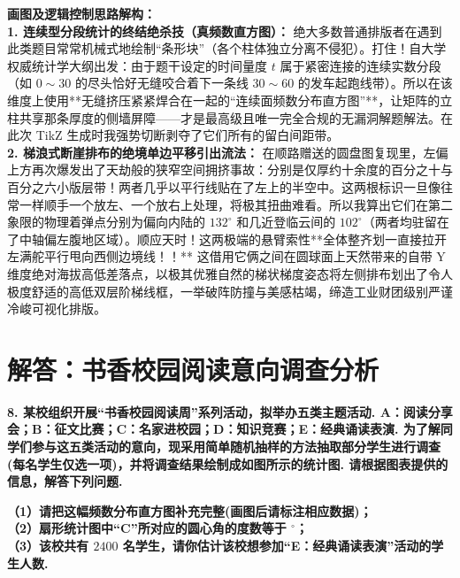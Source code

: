 {\small\color{blue!70!black}
\textbf{画图及逻辑控制思路解构：}\\
\textbf{1. 连续型分段统计的终结绝杀技（真频数直方图）：} 绝大多数普通排版者在遇到此类题目常常机械式地绘制“条形块”（各个柱体独立分离不侵犯）。打住！自大学权威统计学大纲出发：由于题干设定的时间量度 $t$ 属于紧密连接的连续实数分段（如 $0{\sim}30$ 的尽头恰好无缝咬合着下一条线 $30{\sim}60$ 的发车起跑线带）。所以在该维度上使用**无缝挤压紧紧焊合在一起的“连续面频数分布直方图”**，让矩阵的立柱共享那条厚度的侧墙屏障——才是最高级且唯一完全合规的无漏洞解题解法。在此次 TikZ 生成时我强势切断剥夺了它们所有的留白间距带。\\
\textbf{2. 梯浪式断崖排布的绝境单边平移引出流法：} 在顺路赠送的圆盘图复现里，左偏上方再次爆发出了天劫般的狭窄空间拥挤事故：分别是仅厚约十余度的百分之十与百分之六小版层带！两者几乎以平行线贴在了左上的半空中。这两根标识一旦像往常一样顺手一个放左、一个放右上处理，将极其扭曲难看。所以我算出它们在第二象限的物理着弹点分别为偏向内陆的 $132^\circ$ 和几近登临云间的 $102^\circ$（两者均驻留在了中轴偏左腹地区域）。顺应天时！这两极端的悬臂索性**全体整齐划一直接拉开左满舵平行甩向西侧边境线！！** 这借用它俩之间在圆球面上天然带来的自带 Y 维度绝对海拔高低差落点，以极其优雅自然的梯状梯度姿态将左侧排布划出了令人极度舒适的高低双层阶梯线框，一举破阵防撞与美感枯竭，缔造工业财团级别严谨冷峻可视化排版。
}



\newpage



\section{解答：书香校园阅读意向调查分析}

\vspace{0.6cm}

\textbf{8. 某校组织开展“书香校园阅读周”系列活动，拟举办五类主题活动. A：阅读分享会；B：征文比赛；C：名家进校园；D：知识竞赛；E：经典诵读表演. 为了解同学们参与这五类活动的意向，现采用简单随机抽样的方法抽取部分学生进行调查(每名学生仅选一项)，并将调查结果绘制成如图所示的统计图. 请根据图表提供的信息，解答下列问题.}

\vspace{0.4cm}

\textbf{（1）请把这幅频数分布直方图补充完整(画图后请标注相应数据)；\\
（2）扇形统计图中“C”所对应的圆心角的度数等于 \underline{\makebox[1.5cm]{}}$^\circ$；\\
（3）该校共有 $2400$ 名学生，请你估计该校想参加“E：经典诵读表演”活动的学生人数.}

